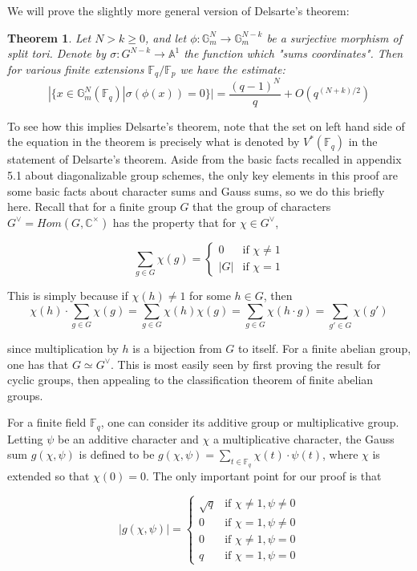 \documentclass{ucbthesis}
\newtheorem{thm}{Theorem}[section]
\theoremstyle{definition}
\theoremstyle{theorem}
\begin{document}
We will prove the slightly more general version of Delsarte's theorem:

\begin{thm}
Let $N>k\geq 0$, and let $\phi:\mathbb{G}_{m}^{N}\rightarrow \mathbb{G}_{m}^{N-k}$ be a surjective morphism of split tori. Denote by $\sigma:G^{N-k} \rightarrow \mathbb{A}^{1}$ the function which "sums coordinates". Then for various finite extensions $\mathbb{F}_q/\mathbb{F}_p$ we have the estimate:
$$ |\{x\in \mathbb{G}_{m}^{N}(\mathbb{F}_q)|\sigma(\phi(x))=0\}| = \frac{(q-1)^{N}}{q} + O(q^{(N+k)/2})$$
\end{thm}

To see how this implies Delsarte's theorem, note that the set on left hand side of the equation in the theorem is precisely what is denoted by $V^{*}(\mathbb{F}_{q})$ in the statement of Delsarte's theorem. Aside from the basic facts recalled in appendix 5.1 about diagonalizable group schemes, the only key elements in this proof are some basic facts about character sums and Gauss sums, so we do this briefly here. Recall that for a finite group $G$ that the group of characters $G^{\vee} = Hom(G,\mathbb{C}^{\times})$ has the property that for $\chi\in G^{\vee}$, 

\[ \sum\limits_{g\in G}\chi(g) = 
\begin{cases}
   0         & \mbox{if } \chi \neq 1 \\
   |G|       & \mbox{if } \chi = 1
  \end{cases}
\]


This is simply because if $\chi(h) \neq 1$ for some $h\in G$, then 
$$\chi(h)\cdot\sum\limits_{g\in G}\chi(g) = \sum\limits_{g\in G}\chi(h)\chi(g) = \sum\limits_{g\in G}\chi(h\cdot g) = \sum\limits_{g'\in G}\chi(g')$$

since multiplication by $h$ is a bijection from $G$ to itself. For a finite abelian group, one has that $G\simeq G^{\vee}$. This is most easily seen by first proving the result for cyclic groups, then appealing to the classification theorem of finite abelian groups. 

For a finite field $\mathbb{F}_{q}$, one can consider its additive group or multiplicative group. Letting $\psi$ be an additive character and $\chi$ a multiplicative character, the Gauss sum $g(\chi,\psi)$ is defined to be $g(\chi,\psi) = \sum\limits_{t\in \mathbb{F}_{q}}\chi(t)\cdot\psi(t)$, where $\chi$ is extended so that $\chi(0) = 0$. The only important point for our proof is that 

\[
|g(\chi,\psi)| = \begin{cases}
   \sqrt{q} & \mbox{if } \chi \neq 1, \psi \neq 0 \\
   0       & \mbox{if } \chi = 1, \psi \neq 0 \\
   0       & \mbox{if } \chi \neq 1, \psi = 0 \\
   q       & \mbox{if } \chi = 1, \psi = 0
  \end{cases}
\]
\end{document}
